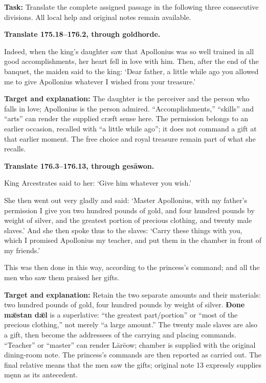 \textbf{Task:} Translate the complete assigned passage in the following three consecutive divisions. All local help and original notes remain available.

\textbf{Translate 175.18–176.2, through goldhorde.}

Indeed, when the king’s daughter saw that Apollonius was so well trained in all good accomplishments, her heart fell in love with him. Then, after the end of the banquet, the maiden said to the king: ‘Dear father, a little while ago you allowed me to give Apollonius whatever I wished from your treasure.’

\textbf{Target and explanation:} The daughter is the perceiver and the person who falls in love; Apollonius is the person admired. “Accomplishments,” “skills” and “arts” can render the supplied cræft sense here. The permission belongs to an earlier occasion, recalled with “a little while ago”; it does not command a gift at that earlier moment. The free choice and royal treasure remain part of what she recalls.

\textbf{Translate 176.3–176.13, through gesāwon.}

King Arcestrates said to her: ‘Give him whatever you wish.’

She then went out very gladly and said: ‘Master Apollonius, with my father’s permission I give you two hundred pounds of gold, and four hundred pounds by weight of silver, and the greatest portion of precious clothing, and twenty male slaves.’ And she then spoke thus to the slaves: ‘Carry these things with you, which I promised Apollonius my teacher, and put them in the chamber in front of my friends.’

This was then done in this way, according to the princess’s command; and all the men who saw them praised her gifts.

\textbf{Target and explanation:} Retain the two separate amounts and their materials: two hundred pounds of gold, four hundred pounds by weight of silver. \textbf{Ðone mǣstan dǣl} is a superlative: “the greatest part/\allowbreak{}portion” or “most of the precious clothing,” not merely “a large amount.” The twenty male slaves are also a gift, then become the addressees of the carrying and placing commands. “Teacher” or “master” can render Lārēow; chamber is supplied with the original dining-room note. The princess’s commands are then reported as carried out. The final relative means that the men saw the gifts; original note 13 expressly supplies męnn as its antecedent.

